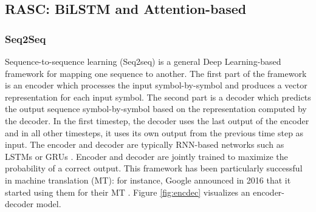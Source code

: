 




\subsection{RASC: BiLSTM and Attention-based} \label{subsec:bilstm}

\subsubsection{Seq2Seq} \label{subsubsec:seq2seq}
Sequence-to-sequence learning (Seq2seq) \cite{seq2seq} is a general Deep Learning-based framework for mapping one sequence to another. The first part of the framework is an encoder which processes the input symbol-by-symbol and produces a vector representation for each input symbol. The second part is a decoder which predicts the output sequence symbol-by-symbol based on the representation computed by the decoder. In the first timestep, the decoder uses the last output of the encoder and in all other timesteps, it uses its own output from the previous time step as input. The encoder and decoder are typically RNN-based networks such as LSTMs \cite{lstm} or GRUs \cite{gru}. Encoder and decoder are jointly trained to maximize the probability of a correct output. This framework has been particularly successful in machine translation (MT): for instance, Google announced in 2016 that it started using them for their MT \cite{googlemt2016}. Figure \ref{fig:encdec} visualizes an encoder-decoder model.

